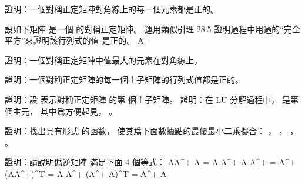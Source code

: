 \startsection[
  title={Symmetric positive-definite matrices and least-squares approximation},
]

\startEXERCISE
證明：一個對稱正定矩陣對角線上的每一個元素都是正的。
\stopEXERCISE

\startANSWER
{}
\stopANSWER

\startEXERCISE
設如下矩陣  是一個  的對稱正定矩陣。
運用類似引理 28.5 證明過程中用過的“完全平方”來證明該行列式的值  是正的。
\startformula
A=
\stopformula
\stopEXERCISE

\startANSWER
{}
\stopANSWER

\startEXERCISE
證明：一個對稱正定矩陣中值最大的元素在對角線上。
\stopEXERCISE

\startANSWER
{}
\stopANSWER

\startEXERCISE
證明：一個對稱正定矩陣的每一個主子矩陣的行列式值都是正的。
\stopEXERCISE

\startANSWER
{}
\stopANSWER

\startEXERCISE
證明：設  表示對稱正定矩陣  的第  個主子矩陣。
證明：在 LU 分解過程中，  是第  個主元，
其中爲方便起見， 。
\stopEXERCISE

\startANSWER
{}
\stopANSWER

\startEXERCISE
證明：找出具有形式  的函數，
使其爲下面數據點的最優最小二乘擬合：
 ， ， ， 。
\stopEXERCISE

\startANSWER
{}
\stopANSWER

\startEXERCISE
證明：請說明僞逆矩陣  滿足下面 4 個等式：
\startformula\startmathalignment
\NC AA^+ A \NC = A \NR
\NC A^+ A A^+ \NC = A^+ \NR
\NC (AA^+)^T \NC = A A^+ \NR
\NC (A^+ A)^T \NC = A^+ A \NR
\stopmathalignment\stopformula
\stopEXERCISE

\startANSWER
{}
\stopANSWER

\stopsection
